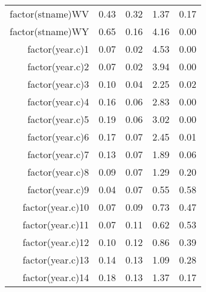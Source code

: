 \begin{table}[ht]
\begin{tabular}{rrrrr}
  factor(stname)WV & 0.43 & 0.32 & 1.37 & 0.17 \\ 
  factor(stname)WY & 0.65 & 0.16 & 4.16 & 0.00 \\ 
  factor(year.c)1 & 0.07 & 0.02 & 4.53 & 0.00 \\ 
  factor(year.c)2 & 0.07 & 0.02 & 3.94 & 0.00 \\ 
  factor(year.c)3 & 0.10 & 0.04 & 2.25 & 0.02 \\ 
  factor(year.c)4 & 0.16 & 0.06 & 2.83 & 0.00 \\ 
  factor(year.c)5 & 0.19 & 0.06 & 3.02 & 0.00 \\ 
  factor(year.c)6 & 0.17 & 0.07 & 2.45 & 0.01 \\ 
  factor(year.c)7 & 0.13 & 0.07 & 1.89 & 0.06 \\ 
  factor(year.c)8 & 0.09 & 0.07 & 1.29 & 0.20 \\ 
  factor(year.c)9 & 0.04 & 0.07 & 0.55 & 0.58 \\ 
  factor(year.c)10 & 0.07 & 0.09 & 0.73 & 0.47 \\ 
  factor(year.c)11 & 0.07 & 0.11 & 0.62 & 0.53 \\ 
  factor(year.c)12 & 0.10 & 0.12 & 0.86 & 0.39 \\ 
  factor(year.c)13 & 0.14 & 0.13 & 1.09 & 0.28 \\ 
  factor(year.c)14 & 0.18 & 0.13 & 1.37 & 0.17 \\ 
   \hline
\end{tabular}
\end{table}
